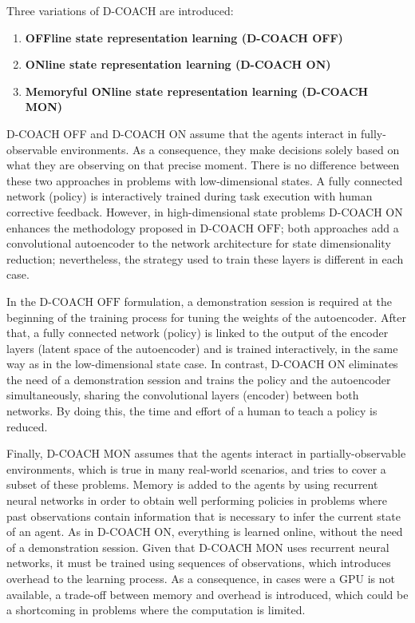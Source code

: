 Three variations of D-COACH are introduced:

\begin{enumerate}
    \item \textbf{OFFline state representation learning (D-COACH OFF)}
    \item \textbf{ONline state representation learning (D-COACH ON)}
    \item \textbf{Memoryful ONline state representation learning (D-COACH MON)}
\end{enumerate}

D-COACH OFF and D-COACH ON assume that the agents interact in fully-observable environments. As a consequence, they make decisions solely based on what they are observing on that precise moment. There is no difference between these two approaches in problems with low-dimensional states. A fully connected network (policy) is interactively trained during task execution with human corrective feedback. However, in high-dimensional state problems D-COACH ON enhances the methodology proposed in $\text{D-COACH OFF}$; both approaches add a convolutional autoencoder to the network architecture for state dimensionality reduction; nevertheless, the strategy used to train these layers is different in each case. 

In the $\text{D-COACH OFF}$ formulation, a demonstration session is required at the beginning of the training process for tuning the weights of the autoencoder. After that, a fully connected network (policy) is linked to the output of the encoder layers (latent space of the autoencoder) and is trained interactively, in the same way as in the low-dimensional state case. In contrast, D-COACH ON eliminates the need of  a demonstration session and trains the policy and the autoencoder simultaneously, sharing the convolutional layers (encoder) between both networks. By doing this, the time and effort of a human to teach a policy is reduced.

Finally, D-COACH MON assumes that the agents interact in partially-observable environments, which is true in many real-world scenarios, and tries to cover a subset of these problems. Memory is added to the agents by using recurrent neural networks in order to obtain well performing policies in problems where past observations contain information that is necessary to infer the current state of an agent. As in D-COACH ON, everything is learned online, without the need of a demonstration session. Given that D-COACH MON uses recurrent neural networks, it must be trained using sequences of observations, which introduces overhead to the learning process. As a consequence, in cases were a GPU is not available, a trade-off between memory and overhead is introduced, which could be a shortcoming in problems where the computation is limited.

